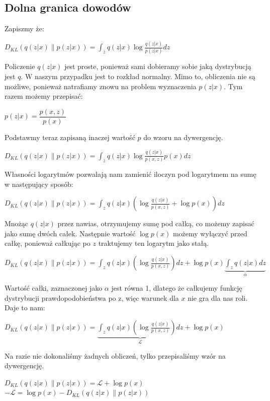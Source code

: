\documentclass[a4paper,12pt]{book} %
\begin{document}
\subsection{Dolna granica dowodów}
Zapiszmy że:
\begin{center}
	$D_{KL}(q(z|x)\|p(z|x))=\displaystyle\int_{z}^{}q(z|x)\log\frac{q(z|x)}{p(z|x)}dz$
\end{center}
Policzenie $q(z|x)$ jest proste, ponieważ sami dobieramy sobie jaką dystrybucją jest $q$. W naszym przypadku jest to rozkład normalny. Mimo to, obliczenia nie są możliwe, ponieważ natrafiamy znowu na problem wyznaczenia $p(z|x)$. Tym razem możemy przepisać:
\begin{center}
	$p(z|x)=\dfrac{p(x,z)}{p(x)}$
\end{center}
Podstawmy teraz zapisaną inaczej wartość $p$ do wzoru na dywergencję.
\begin{center}
	$D_{KL}(q(z|x)\|p(z|x))=\displaystyle\int_{z}^{}q(z|x)\log\frac{q(z|x)}{p(x,z)}p(x)dz$
\end{center}
Własności logarytmów pozwalają nam zamienić iloczyn pod logarytmem na sumę w następujący sposób:
\begin{center}
	$D_{KL}(q(z|x)\|p(z|x))=\displaystyle\int_{z}^{}q(z|x)\left( \log\frac{q(z|x)}{p(x,z)} + \log p(x)\right) dz$
\end{center}
Mnożąc $q(z|x)$ przez nawias, otrzymujemy sumę pod całką, co możemy zapisać jako sumę dwóch całek. Następnie wartość $\log p(x)$ możemy wyłączyć przed całkę, ponieważ całkując po $z$ traktujemy ten logarytm jako stałą.
\begin{center}
	$D_{KL}(q(z|x)\|p(z|x))=\displaystyle\int_{z}^{}q(z|x)\left( \log\frac{q(z|x)}{p(x,z)}\right)dz + \log p(x)\underbrace{\displaystyle\int_{z}^{}q(z|x)dz}_{\text{$\alpha$}}$
\end{center}
Wartość całki, zaznaczonej jako $\alpha$ jest równa 1, dlatego że całkujemy funkcję dystrybucji prawdopodobieństwa po z, więc warunek dla $x$ nie gra dla nas roli. Daje to nam:
\begin{center}
	$D_{KL}(q(z|x)\|p(z|x))=\underbrace{\displaystyle\int_{z}^{}q(z|x)\left( \log\frac{q(z|x)}{p(x,z)}\right)dz}_{\text{$\mathcal{L}$}} + \log p(x)$
\end{center}
Na razie nie dokonaliśmy żadnych obliczeń, tylko przepisaliśmy wzór na dywergencję.
\begin{center}
	$D_{KL}(q(z|x)\|p(z|x))= \mathcal{L} + \log p(x)$\\
	$-\mathcal{L} = \log p(x) - D_{KL}(q(z|x)\|p(z|x))$
\end{center}
\end{document}
